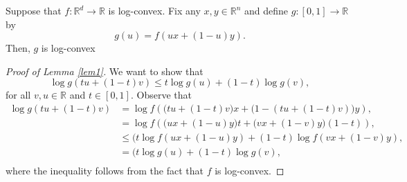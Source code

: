 \documentclass{amsart}
\theoremstyle{definition}
\begin{document}
\begin{lemma} \label{lem1}
Suppose that $f : \mathbb{R}^d \rightarrow \mathbb{R}$ is log-convex. Fix any $x,y \in \mathbb{R}^n$ and define $g : [0,1] \rightarrow \mathbb{R}$ by
$$
g(u) =  f( u x + (1-u) y ).
$$
Then, $g$ is log-convex
\end{lemma}
\begin{proof}[Proof of Lemma \ref{lem1}] We want to show that
$$
\log g( t u + (1-t) v)  \le t \log g(u) + (1-t) \log g(v),
$$
for all $v,u \in \mathbb{R}$ and $t \in [0,1]$. Observe that
\begin{equation*}
\begin{split}
\log g(t u + (1-t)v) 
&= \log f\left( \big(tu + (1-t)v\big) x + \big(1- (tu + (1-t)v) \big)y\right),\\
&= \log f\left( \big(u x + (1-u)y \big)t + \big(v x + (1-v) y\big)(1-t) \right), \\
&\le (t \log f\left( u x + (1-u)y  \right) + (1-t) \log f \left(v x + (1-v) y\right), \\
& =  (t \log g(u) + (1-t) \log g(v), \\
\end{split}
\end{equation*}
where the inequality follows from the fact that $f$ is log-convex.

\end{proof}
\end{document}
